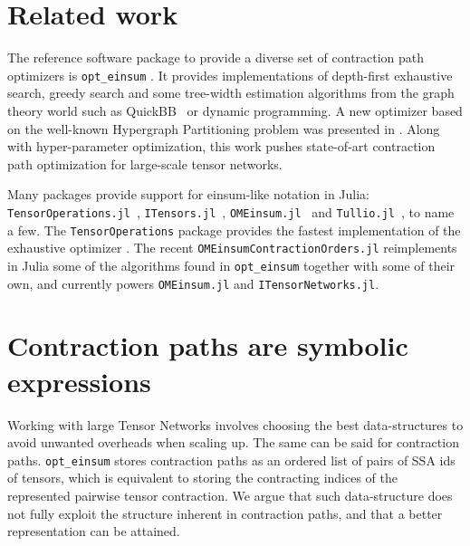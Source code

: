 \documentclass{juliacon}
\begin{document}
\section{Related work}\label{sec:related-work}
The reference software package to provide a diverse set of contraction path optimizers is \texttt{opt\_einsum} \cite{daniel2018opt}. It provides implementations of depth-first exhaustive search, greedy search and some tree-width estimation algorithms from the graph theory world such as QuickBB~\cite{gogate2012complete} or dynamic programming. A new optimizer based on the well-known Hypergraph Partitioning problem was presented in \cite{gray2021hyper}. Along with hyper-parameter optimization, this work pushes state-of-art contraction path optimization for large-scale tensor networks. 

Many packages provide support for einsum-like notation in Julia: \texttt{TensorOperations.jl}~\cite{devos2023tensoroperations}, \texttt{ITensors.jl}~\cite{fishman2022itensor}, \texttt{OMEinsum.jl}~\cite{omeinsum} and \texttt{Tullio.jl}~\cite{tullio}, to name a few.
The \texttt{TensorOperations} \cite{devos2023tensoroperations} package provides the fastest implementation of the exhaustive optimizer \cite{pfeifer2014faster}.
The recent \texttt{OMEinsumContractionOrders.jl} reimplements in Julia some of the algorithms found in \texttt{opt\_einsum} together with some of their own, and currently powers \texttt{OMEinsum.jl} and \texttt{ITensorNetworks.jl}.

\section{Contraction paths are symbolic expressions}\label{sec:symbolic-expr}

Working with large Tensor Networks involves choosing the best data-structures to avoid unwanted overheads when scaling up. The same can be said for contraction paths. \texttt{opt\_einsum} stores contraction paths as an ordered list of pairs of SSA ids of tensors, which is equivalent to storing the contracting indices of the represented pairwise tensor contraction. We argue that such data-structure does not fully exploit the structure inherent in contraction paths, and that a better representation can be attained.
\end{document}
